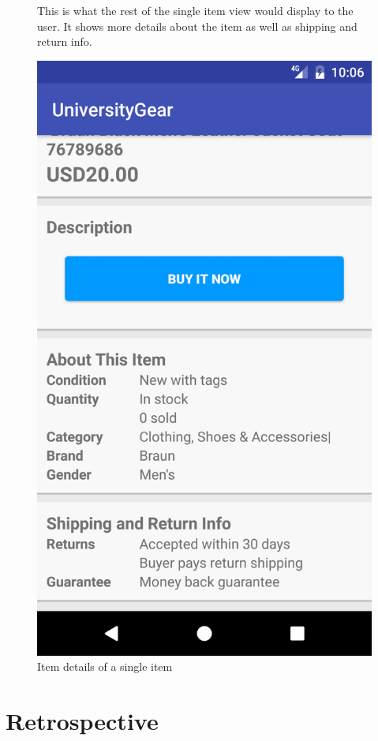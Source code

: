 \documentclass[journal,compsoc, 10pt, draftclsnofoot, onecolumn]{IEEEtran}
\begin{document}
\begin{figure}[t]
This is what the rest of the single item view would display to the user. It 
shows more details about the item as well as shipping and return info.
\centering
\caption{Item details of a single item}
\includegraphics[scale=.2]{singleview2}
\end{figure}
\FloatBarrier

\section{Retrospective}
\end{document}
